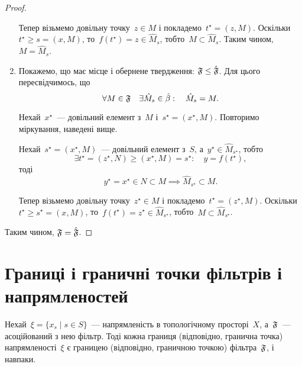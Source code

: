 \begin{proof}
\begin{enumerate}
        Тепер візьмемо довільну точку~$z \in M$ і покладемо~$t^\star = (z, M)$. Оскільки~$t^\star \ge s = (x, M)$, то~$f(t^\star) = z \in \hat M_s$, тобто~$M \subset \hat M_s$. Таким чином, $M = \hat M_s$.

        \item Покажемо, що має місце і обернене твердження: $\frak F \le \hat{\frak F}$. Для цього пересвідчимось, що
        \begin{equation*}
            \forall M \in \frak F \quad
            \exists \hat M_s \in \hat \beta: \quad
            \hat M_s = M.
        \end{equation*}

        Нехай~$x^\star$~--- довільний елемент з~$M$ і~$s^\star = (x^\star, M)$. Повторимо міркування, наведені вище. 

        Нехай~$s^\star = (x^\star, M)$~--- довільний елемент з~$S$, а~$y^\star \in \hat M_{s^\star}$, тобто
        \begin{equation*}
            \exists t^\star = (z^\star, N) \ge (x^\star, M) = s^\star: \quad y = f(t^\star),
        \end{equation*}
        тоді
        \begin{equation*}
            y^\star = x^\star \in N \subset M \implies \hat M_{s^\star} \subset M.
        \end{equation*}

        Тепер візьмемо довільну точку~$z^\star \in M$ і покладемо~$t^\star = (z^\star, M)$. Оскільки~$t^\star \ge s^\star = (x, M)$, то~$f(t^\star) = z^\star \in \hat M_{s^\star}$, тобто~$M \subset \hat M_{s^\star}$.
    \end{enumerate}
    
    Таким чином, $\frak F = \hat{\frak F}$.
\end{proof}

\section{Границі і граничні точки фільтрів і напрямленостей}

\begin{theorem}
    Нехай~$\xi = \{x_s \mid s \in S\}$~--- напрямленість в топологічному просторі~$X$, а~$\frak F$~--- асоційований з нею фільтр. Тоді кожна границя (відповідно, гранична точка) напрямленості~$\xi$ є границею (відповідно, граничною точкою) фільтра~$\frak F$, і навпаки.
\end{theorem}

